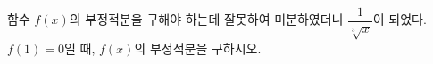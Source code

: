 함수 $f(x)$의 부정적분을 구해야 하는데 잘못하여 미분하였더니 $\dfrac{1}{\sqrt[3]{x}}$이 되었다. $f(1)=0$일 때, $f(x)$의 부정적분을 구하시오.
